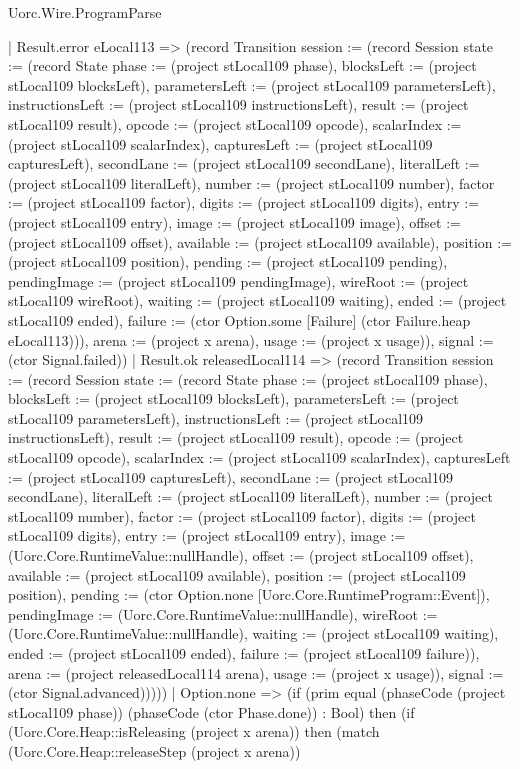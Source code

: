\begin{lexlean}{Uorc.Wire.ProgramParse}
\begin{semanticmodule}
{      | Result.error eLocal113 => (record Transition {session := (record Session {state := (record State {phase := (project stLocal109 phase), blocksLeft := (project stLocal109 blocksLeft), parametersLeft := (project stLocal109 parametersLeft), instructionsLeft := (project stLocal109 instructionsLeft), result := (project stLocal109 result), opcode := (project stLocal109 opcode), scalarIndex := (project stLocal109 scalarIndex), capturesLeft := (project stLocal109 capturesLeft), secondLane := (project stLocal109 secondLane), literalLeft := (project stLocal109 literalLeft), number := (project stLocal109 number), factor := (project stLocal109 factor), digits := (project stLocal109 digits), entry := (project stLocal109 entry), image := (project stLocal109 image), offset := (project stLocal109 offset), available := (project stLocal109 available), position := (project stLocal109 position), pending := (project stLocal109 pending), pendingImage := (project stLocal109 pendingImage), wireRoot := (project stLocal109 wireRoot), waiting := (project stLocal109 waiting), ended := (project stLocal109 ended), failure := (ctor Option.some [Failure] (ctor Failure.heap eLocal113))}), arena := (project x arena), usage := (project x usage)}), signal := (ctor Signal.failed)})
      | Result.ok releasedLocal114 => (record Transition {session := (record Session {state := (record State {phase := (project stLocal109 phase), blocksLeft := (project stLocal109 blocksLeft), parametersLeft := (project stLocal109 parametersLeft), instructionsLeft := (project stLocal109 instructionsLeft), result := (project stLocal109 result), opcode := (project stLocal109 opcode), scalarIndex := (project stLocal109 scalarIndex), capturesLeft := (project stLocal109 capturesLeft), secondLane := (project stLocal109 secondLane), literalLeft := (project stLocal109 literalLeft), number := (project stLocal109 number), factor := (project stLocal109 factor), digits := (project stLocal109 digits), entry := (project stLocal109 entry), image := (Uorc.Core.RuntimeValue::nullHandle), offset := (project stLocal109 offset), available := (project stLocal109 available), position := (project stLocal109 position), pending := (ctor Option.none [Uorc.Core.RuntimeProgram::Event]), pendingImage := (Uorc.Core.RuntimeValue::nullHandle), wireRoot := (Uorc.Core.RuntimeValue::nullHandle), waiting := (project stLocal109 waiting), ended := (project stLocal109 ended), failure := (project stLocal109 failure)}), arena := (project releasedLocal114 arena), usage := (project x usage)}), signal := (ctor Signal.advanced)}))))
    | Option.none => (if (prim equal (phaseCode (project stLocal109 phase)) (phaseCode (ctor Phase.done)) : Bool) then (if (Uorc.Core.Heap::isReleasing (project x arena)) then (match (Uorc.Core.Heap::releaseStep (project x arena))
}
\end{semanticmodule}
\end{lexlean}
